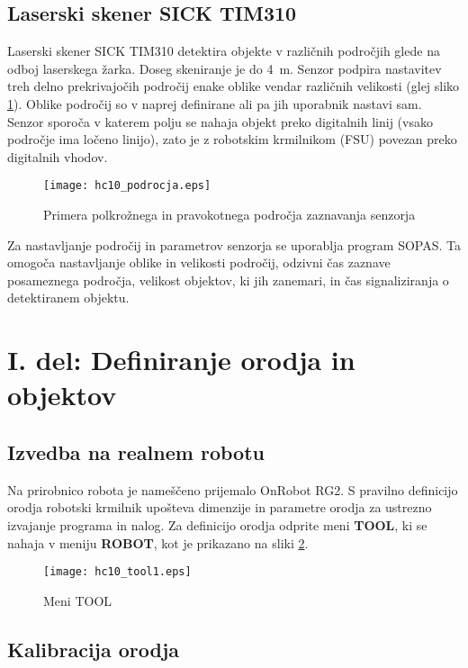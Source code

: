 \subsection{Laserski skener SICK TIM310}

Laserski skener SICK TIM310 detektira objekte v različnih področjih glede na odboj laserskega žarka. Doseg skeniranje je do 4~m. Senzor podpira nastavitev treh delno prekrivajočih področij enake oblike vendar različnih velikosti (glej sliko \ref{fig:hc10_sick}). Oblike področij so  v naprej definirane ali pa jih uporabnik nastavi sam. Senzor sporoča v katerem polju se nahaja objekt preko digitalnih linij (vsako področje ima ločeno linijo), zato je z robotskim krmilnikom (FSU) povezan preko digitalnih vhodov.

\begin{figure}[!hbt]
	\centering
	\texttt{[image: hc10\_podrocja.eps]}
	\caption{Primera polkrožnega in pravokotnega področja zaznavanja senzorja}
	\label{fig:hc10_sick}
\end{figure}

Za nastavljanje področij in parametrov senzorja se uporablja program SOPAS. Ta omogoča nastavljanje oblike in velikosti področij, odzivni čas zaznave posameznega področja, velikost objektov, ki jih zanemari, in čas signaliziranja o detektiranem objektu.

\section{I. del: Definiranje orodja in objektov}

\subsection{Izvedba na realnem robotu}

Na prirobnico robota je nameščeno prijemalo OnRobot RG2. S pravilno definicijo orodja robotski krmilnik upošteva dimenzije in parametre orodja za ustrezno izvajanje programa in nalog. Za definicijo orodja odprite meni \textbf{TOOL}, ki se nahaja v meniju \textbf{ROBOT}, kot je prikazano na sliki \ref{fig:hc10_tool1}.

\begin{figure}[!hbt]
	\centering
	\texttt{[image: hc10\_tool1.eps]}
	\caption{Meni TOOL}
	\label{fig:hc10_tool1}
\end{figure}

\subsection*{Kalibracija orodja}

